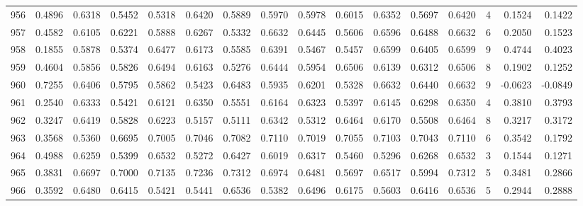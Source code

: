 \begin{tabular}{lrrrrrrrrrrrrrrr}
956 &      0.4896 &  0.6318 &  0.5452 &  0.5318 &  0.6420 &  0.5889 &  0.5970 &  0.5978 &  0.6015 &  0.6352 &   0.5697 &     0.6420 &      4 &                    0.1524 &                     0.1422 \\
957 &      0.4582 &  0.6105 &  0.6221 &  0.5888 &  0.6267 &  0.5332 &  0.6632 &  0.6445 &  0.5606 &  0.6596 &   0.6488 &     0.6632 &      6 &                    0.2050 &                     0.1523 \\
958 &      0.1855 &  0.5878 &  0.5374 &  0.6477 &  0.6173 &  0.5585 &  0.6391 &  0.5467 &  0.5457 &  0.6599 &   0.6405 &     0.6599 &      9 &                    0.4744 &                     0.4023 \\
959 &      0.4604 &  0.5856 &  0.5826 &  0.6494 &  0.6163 &  0.5276 &  0.6444 &  0.5954 &  0.6506 &  0.6139 &   0.6312 &     0.6506 &      8 &                    0.1902 &                     0.1252 \\
960 &      0.7255 &  0.6406 &  0.5795 &  0.5862 &  0.5423 &  0.6483 &  0.5935 &  0.6201 &  0.5328 &  0.6632 &   0.6440 &     0.6632 &      9 &                   -0.0623 &                    -0.0849 \\
961 &      0.2540 &  0.6333 &  0.5421 &  0.6121 &  0.6350 &  0.5551 &  0.6164 &  0.6323 &  0.5397 &  0.6145 &   0.6298 &     0.6350 &      4 &                    0.3810 &                     0.3793 \\
962 &      0.3247 &  0.6419 &  0.5828 &  0.6223 &  0.5157 &  0.5111 &  0.6342 &  0.5312 &  0.6464 &  0.6170 &   0.5508 &     0.6464 &      8 &                    0.3217 &                     0.3172 \\
963 &      0.3568 &  0.5360 &  0.6695 &  0.7005 &  0.7046 &  0.7082 &  0.7110 &  0.7019 &  0.7055 &  0.7103 &   0.7043 &     0.7110 &      6 &                    0.3542 &                     0.1792 \\
964 &      0.4988 &  0.6259 &  0.5399 &  0.6532 &  0.5272 &  0.6427 &  0.6019 &  0.6317 &  0.5460 &  0.5296 &   0.6268 &     0.6532 &      3 &                    0.1544 &                     0.1271 \\
965 &      0.3831 &  0.6697 &  0.7000 &  0.7135 &  0.7236 &  0.7312 &  0.6974 &  0.6481 &  0.5697 &  0.6517 &   0.5994 &     0.7312 &      5 &                    0.3481 &                     0.2866 \\
966 &      0.3592 &  0.6480 &  0.6415 &  0.5421 &  0.5441 &  0.6536 &  0.5382 &  0.6496 &  0.6175 &  0.5603 &   0.6416 &     0.6536 &      5 &                    0.2944 &                     0.2888 \\

\end{tabular}
